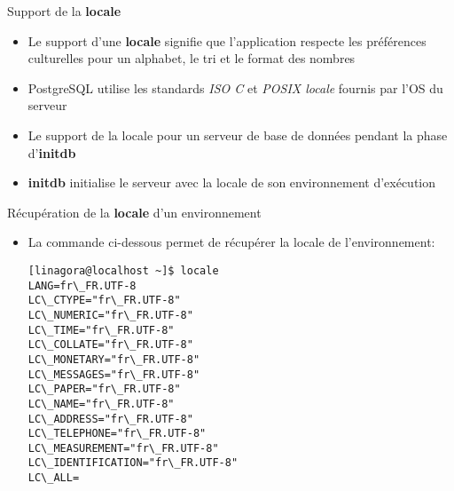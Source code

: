 
\begin{frame}[fragile]{Support de la \textbf{locale}}

\begin{itemize}
   \item Le support d'une \textbf{locale} signifie que l'application respecte les préférences culturelles pour un alphabet, le tri et le format des nombres
   \item PostgreSQL utilise les standards \textit{ISO C} et \textit{POSIX locale} fournis par l'OS du serveur
   \item Le support de la locale pour un serveur de base de données pendant la phase d'\textbf{initdb}
   \item \textbf{initdb} initialise le serveur avec la locale de son environnement d'exécution
\end{itemize}

\end{frame}


\begin{frame}[fragile]{Récupération de la \textbf{locale} d'un environnement}

\begin{itemize}
   \item La commande ci-dessous permet de récupérer la locale de l'environnement:
\begin{tiny}
\begin{Verbatim}[commandchars=\&\{\}]
[linagora@localhost ~]$ locale
LANG=fr\_FR.UTF-8
LC\_CTYPE="fr\_FR.UTF-8"
LC\_NUMERIC="fr\_FR.UTF-8"
LC\_TIME="fr\_FR.UTF-8"
LC\_COLLATE="fr\_FR.UTF-8"
LC\_MONETARY="fr\_FR.UTF-8"
LC\_MESSAGES="fr\_FR.UTF-8"
LC\_PAPER="fr\_FR.UTF-8"
LC\_NAME="fr\_FR.UTF-8"
LC\_ADDRESS="fr\_FR.UTF-8"
LC\_TELEPHONE="fr\_FR.UTF-8"
LC\_MEASUREMENT="fr\_FR.UTF-8"
LC\_IDENTIFICATION="fr\_FR.UTF-8"
LC\_ALL=
\end{Verbatim}
\end{tiny}
\end{itemize}

\end{frame}


